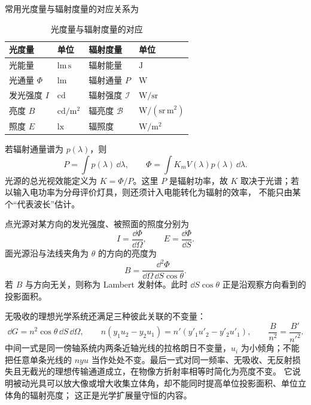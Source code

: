 常用光度量与辐射度量的对应关系为
\begin{table}[htbp]
\centering
\caption{光度量与辐射度量的对应}
\begin{tabular}{llll}
\toprule
光度量&单位&辐射度量&单位\\
\midrule
光能量&$\mathrm{lm\,s}$&辐射能量&$\mathrm J$\\
光通量 $\Phi$&$\mathrm{lm}$&辐射通量 $P$&$\mathrm W$\\
发光强度 $I$&$\mathrm{cd}$&辐射强度 $\mathcal I$&$\mathrm{W/sr}$\\
亮度 $B$&$\mathrm{cd/m^2}$&辐亮度 $\mathcal B$&$\mathrm{W/(sr\,m^2)}$\\
照度 $E$&$\mathrm{lx}$&辐照度&$\mathrm{W/m^2}$\\
\bottomrule
\end{tabular}
\end{table}

若辐射通量谱为 $p(\lambda)$，则
\[
 P=\int p(\lambda)\,\dd\lambda,\qquad
 \Phi=\int K_mV(\lambda)p(\lambda)\,\dd\lambda.
\]
光源的总光视效能定义为 $K=\Phi/P$。这里 $P$ 是辐射功率，故 $K$ 取决于光谱；若以输入电功率为分母评价灯具，则还须计入电能转化为辐射的效率，
不能只由某个“代表波长”估计。

点光源对某方向的发光强度、被照面的照度分别为
\[
 I=\frac{\dd\Phi}{\dd\Omega},\qquad
 E=\frac{\dd\Phi}{\dd S}.
\]
面光源沿与法线夹角为 $\theta$ 的方向的亮度为
\[
 B=\frac{\dd^2\Phi}{\dd\Omega\,\dd S\cos\theta}.
\]
若 $B$ 与方向无关，则称为 Lambert 发射体。此时
$\dd S\cos\theta$ 正是沿观察方向看到的投影面积。

无吸收的理想光学系统还满足三种彼此关联的不变量：
\[
 \dd G=n^2\cos\theta\,\dd S\,\dd\Omega,
 \qquad n(y_1u_2-y_2u_1)=n'(y'_1u'_2-y'_2u'_1),
 \qquad \frac{B}{n^2}=\frac{B'}{n'^2}.
\]
中间一式是同一傍轴系统内两条近轴光线的拉格朗日不变量，$u_i$ 为小倾角；不能把任意单条光线的 $nyu$ 当作处处不变。最后一式对同一频率、无吸收、无反射损失且无截光的理想传输通道成立，在物像方折射率相等时简化为亮度不变。
它说明被动光具可以放大像或增大收集立体角，却不能同时提高单位投影面积、单位立体角的辐射亮度；
这正是光学扩展量守恒的内容。
